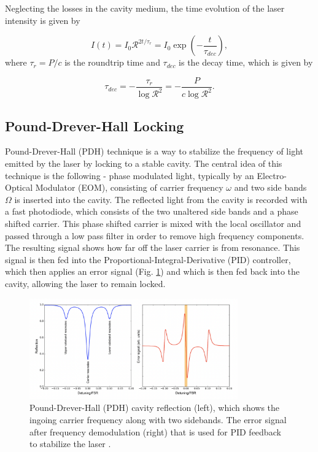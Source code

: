 \documentclass[a4paper]{report}
\numberwithin{equation}{section}
\begin{document}
Neglecting the losses in the cavity medium, the time evolution of the laser intensity is given by

\begin{equation}
		\label{eqn:ring-down}
		I(t) = I_{0}\mathcal{R}^{2t/\tau _{r}} = I_{0} \exp\left(-\frac{t}{\tau _{dec}}\right),
\end{equation}
where $\tau _{r} = P /c $ is the roundtrip time and $\tau _{dec}$ is the decay time, which is given by

\begin{equation}\label{eqn:reflec}
		\tau _{dec} = -\frac{\tau _{r}}{\log \mathcal{R}^2} = - \frac{P}{c \log \mathcal{R}^2}.
\end{equation}

\subsection{Pound-Drever-Hall Locking}
Pound-Drever-Hall (PDH) technique is a way to stabilize the frequency of light emitted by the laser by locking to a stable cavity. The central idea of this technique is the following - phase modulated light, typically by an Electro-Optical Modulator (EOM), consisting of carrier frequency $\omega$ and two side bands $\Omega$ is inserted into the cavity. The reflected light from the cavity is recorded with a fast photodiode, which consists of the two unaltered side bands and a phase shifted carrier. This phase shifted carrier is mixed with the local oscillator and passed through a low pass filter in order to remove high frequency components. The resulting signal shows how far off the laser carrier is from resonance. This signal is then fed into the Proportional-Integral-Derivative (PID) controller, which then applies an error signal (Fig. \ref{fig:error-signal}) and which is then fed back into the cavity, allowing the laser to remain locked.

\begin{figure}[htpb]
    \centering
    \includegraphics[width=0.8\textwidth]{error-signal}
	\caption{Pound-Drever-Hall (PDH) cavity reflection (left), which shows the ingoing carrier frequency along with two sidebands. The error signal after frequency demodulation (right) that is used for PID feedback to stabilize the laser \cite{pdhmanual}.}
    \label{fig:error-signal}
\end{figure}
\end{document}
